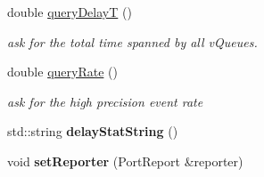 \begin{DoxyCompactItemize}
\mbox{\label{classev_1_1vReadPort_ab84604a7b938a15a67c7db82d1bc82ac}} 
double \hyperlink{classev_1_1vReadPort_ab84604a7b938a15a67c7db82d1bc82ac}{query\+DelayT} ()
\begin{DoxyCompactList}\small\item\em ask for the total time spanned by all v\+Queues. \end{DoxyCompactList}\item 
\mbox{\label{classev_1_1vReadPort_af78cee18124aa9f6729aed6b8de529a5}} 
double \hyperlink{classev_1_1vReadPort_af78cee18124aa9f6729aed6b8de529a5}{query\+Rate} ()
\begin{DoxyCompactList}\small\item\em ask for the high precision event rate \end{DoxyCompactList}\item 
\mbox{\label{classev_1_1vReadPort_abfafe13fd97b9a2f86b0c16f9f77f640}} 
std\+::string {\bfseries delay\+Stat\+String} ()
\item 
\mbox{\label{classev_1_1vReadPort_a174e9ccf70d44d4230822b7558873630}} 
void {\bfseries set\+Reporter} (Port\+Report \&reporter)
\end{DoxyCompactItemize}
